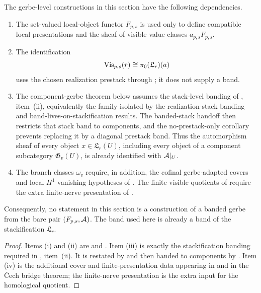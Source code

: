 \begin{proposition}\label{prop:gerbe-layer-hypothesis-map}
The gerbe-level constructions in this section have the following dependencies.
\begin{enumerate}[label=(\roman*),nosep]
\item The set-valued local-object functor $F_{p,s}$ is used only to define
compatible local presentations and the sheaf of visible value classes
$a_{p,s}F_{p,s}$.
\item The identification
\[
\mathrm{Vis}_{p,s}(r)\cong\pi_0(\mathfrak L_r)(a)
\]
uses the chosen realization prestack through
; it does not supply a band.
\item The component-gerbe theorem below assumes the stack-level banding of
, item~\textup{(ii)}, equivalently the family isolated
by the realization-stack banding and band-lives-on-stackification results. The
banded-stack handoff then restricts that stack band to components, and the
no-prestack-only corollary prevents replacing it by a diagonal prestack band.
Thus the automorphism sheaf of every object $x\in\mathfrak L_r(U)$, including
every object of a component subcategory $\mathfrak G_v(U)$, is already
identified with $\mathcal{A}|_U$.
\item The branch classes $\omega_v$ require, in addition, the cofinal
gerbe-adapted covers and local $H^1$-vanishing hypotheses of
. The finite visible quotients of
 require the extra finite-nerve presentation of
.
\end{enumerate}
Consequently, no statement in this section is a construction of a banded gerbe
from the bare pair $(F_{p,s},\mathcal{A})$. The band used here is already a band of
the stackification $\mathfrak L_r$.
\end{proposition}

\begin{proof}
Items \textup{(i)} and \textup{(ii)} are
 and
. Item \textup{(iii)} is exactly the
stackification banding required in
, item~\textup{(ii)}. It is restated by
and then handed to components by
.
Item \textup{(iv)} is the additional cover and finite-presentation data appearing in
 and in the \v{C}ech bridge theorem; the
finite-nerve presentation is the extra input for the homological quotient.
\end{proof}


